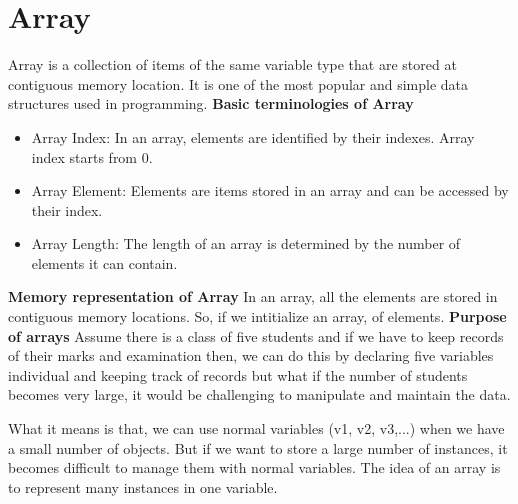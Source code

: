 \section{Array}
Array is a collection of items of the same variable type that are stored
at contiguous memory location. It is one of the most popular and simple
data structures used in programming.
\textbf{Basic terminologies of Array}
\begin{itemize}
\item Array Index: In an array, elements are identified by their
indexes. Array index starts from 0.
\item Array Element: Elements are items stored in an array and can be
accessed by their index.
\item Array Length: The length of an array is determined by the number
of elements it can contain.
\end{itemize}
\textbf{Memory representation of Array}
In an array, all the elements are stored in contiguous memory locations.
So, if we intitialize an array, of elements.
\textbf{Purpose of arrays}
Assume there is a class of five students and if we have to keep records
of their marks and examination then, we can do this by declaring five
variables individual and keeping track of records but what if the number
of students becomes very large, it would be challenging to manipulate
and maintain the data.

What it means is that, we can use normal variables (v1, v2, v3,...)
when we have a small number of objects. But if we want to store a large
number of instances, it becomes difficult to manage them with normal
variables. The idea of an array is to represent many instances in one
variable.
